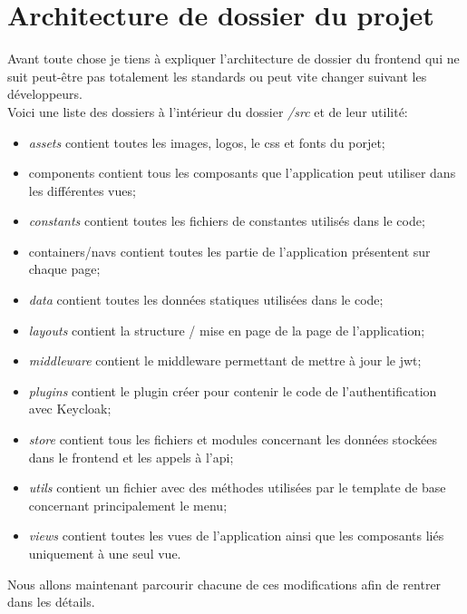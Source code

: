\documentclass[
    iai, %
    il, %
]{heig-tb}
\begin{document}
\section{Architecture de dossier du projet}
Avant toute chose je tiens à expliquer l'architecture de dossier du \Gls{frontend} qui ne suit peut-être pas totalement les standards ou peut vite changer suivant les développeurs. \\
Voici une liste des dossiers à l'intérieur du dossier \emph{/src} et de leur utilité:
\begin{itemize}
    \item \emph{assets} contient toutes les images, logos, le css et fonts du porjet;
    \item components contient tous les composants que l'application peut utiliser dans les différentes vues;
    \item \emph{constants} contient toutes les fichiers de constantes utilisés dans le code;
    \item containers/navs contient toutes les partie de l'application présentent sur chaque page;
    \item \emph{data} contient toutes les données statiques utilisées dans le code;
    \item \emph{layouts} contient la structure / mise en page de la page de l'application;
    \item \emph{middleware} contient le middleware permettant de mettre à jour le \Gls{jwt};
    \item \emph{plugins} contient le plugin créer pour contenir le code de l'authentification avec Keycloak;
    \item \emph{store} contient tous les fichiers et modules concernant les données stockées dans le \Gls{frontend} et les appels à l'\Gls{api};
    \item \emph{utils} contient un fichier avec des méthodes utilisées par le \Gls{template} de base concernant principalement le menu;
    \item \emph{views} contient toutes les vues de l'application ainsi que les composants liés uniquement à une seul vue.
\end{itemize}

Nous allons maintenant parcourir chacune de ces modifications afin de rentrer dans les détails.
\end{document}
